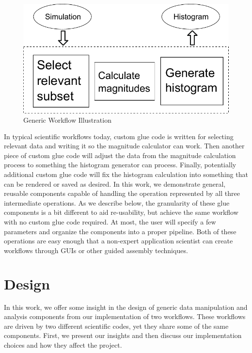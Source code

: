 \documentclass[conference]{IEEEtran}
\begin{document}
\begin{figure}[htbp]
\centering
\includegraphics[width=\columnwidth]{fig/gwflow}
\caption{Generic Workflow Illustration}
\label{fig:generic-workflow}
\end{figure}

In typical scientific workflows today, custom glue code is written for
selecting relevant data and writing it so the magnitude calculator can work.
Then another piece of custom glue code will adjust the data from the magnitude
calculation process to something the histogram generator can process.  Finally,
potentially additional custom glue code will fix the histogram calculation into
something that can be rendered or saved as desired.  In this work, we
demonstrate general, reusable components capable of handling the operation
represented by all three intermediate operations.
As we describe below, the
granularity of these glue components is a bit different to aid re-usability, but
achieve the same workflow with no custom glue code required. At most, the user
will specify a few parameters and organize the components into a proper
pipeline. Both of these operations are easy enough that a non-expert application
scientist can create workflows through GUIs or other guided assembly techniques.

\section{Design}
\label{s:design}

In this work, we offer some insight in the design of generic data manipulation
and analysis components from our implementation of two workflows. These
workflows are driven by two different scientific codes, yet they share some of
the same components. First, we present our insights and then discuss our
implementation choices and how they affect the project.
\end{document}

